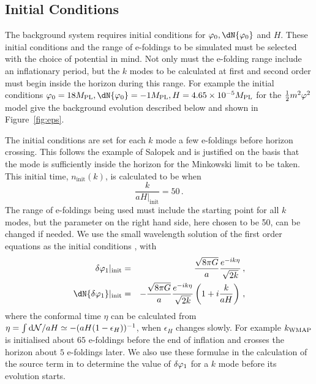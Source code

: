\subsection{Initial Conditions} 
\label{sec:initconds-num}

The background system requires initial conditions for $\vp_{0},
\dN{\vp_{0}}$ and $H$. These initial conditions and the range of
e-foldings to be simulated must be selected with the choice of
potential in mind. Not only must the
e-folding range include an inflationary period, but the $k$ modes to
be calculated at first and second order must begin inside the horizon
during this range. For example the initial conditions $\vp_0 = 18\Mpl,
\dN{\vp_0} = -1 \Mpl, H = 4.65\e{-5}\Mpl$ for the $\frac{1}{2} m^2 \varphi^2$ model 
give the background evolution described below and shown in Figure~\ref{fig:eps}.


The initial conditions are set for each $k$ mode a few e-foldings
before horizon crossing. This follows the example of Salopek
\etal
\cite{Salopek:1988qh} and is justified on the basis that the mode is
sufficiently inside the
horizon for the Minkowski limit to be taken. This initial time,
$n_{\mathrm{init}}(k)$, is calculated to be when
%  
\begin{equation}
 \frac{k}{aH|_{\mathrm{init}}} = 50 \,.
\end{equation}
%
The range of e-foldings being used must include the starting point for
all $k$ modes, but the parameter on the right hand side, here chosen to
be 50, can be changed if needed.  We use the small wavelength solution
of the first order equations as the initial conditions \cite{Salopek:1988qh}, with
%
\begin{eqnarray}
\label{eq:foics}
 \dvp1|_{\mathrm{init}} &=& \frac{\sqrt{8\pi G}}{a}
\frac{e^{-i k\eta}}{\sqrt{2k}} \,,\\
 \dN{\dvp1}|_{\mathrm{init}} &=& -\frac{\sqrt{8\pi G}}{a}
\frac{e^{-i k\eta}}{\sqrt{2k}} \left(1 + i \frac{k}{a H}\right) \,,
\end{eqnarray}
%
where the conformal time $\eta$ can be calculated from $\eta=\int \mathrm{d}\mathcal{N}/aH \simeq
-(aH(1-\epsilon_H))^{-1}$, when $\epsilon_H$ changes slowly. For example $k_\mathrm{WMAP}$ is initialised
about $65$ e-foldings before the end of inflation and crosses the horizon about $5$ e-foldings
later.
We also use these formulae in the calculation of the source term in  to
determine the value of $\delta\varphi_{1}$ for a $k$ mode before its evolution starts.


